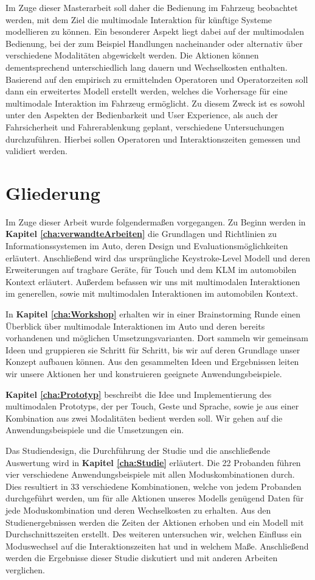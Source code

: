 Im Zuge dieser Masterarbeit soll daher die Bedienung im Fahrzeug beobachtet werden, mit dem Ziel die multimodale Interaktion für künftige Systeme modellieren zu können.
Ein besonderer Aspekt liegt dabei auf der multimodalen Bedienung, bei der zum Beispiel Handlungen nacheinander oder alternativ über verschiedene Modalitäten abgewickelt werden.
Die Aktionen können dementsprechend unterschiedlich lang dauern und Wechselkosten enthalten.
Basierend auf den empirisch zu ermittelnden Operatoren und Operatorzeiten soll dann ein erweitertes Modell erstellt werden, welches die Vorhersage für eine multimodale Interaktion im Fahrzeug ermöglicht.
Zu diesem Zweck ist es sowohl unter den Aspekten der Bedienbarkeit und User Experience, als auch der Fahrsicherheit und Fahrerablenkung geplant, verschiedene Untersuchungen durchzuführen.
Hierbei sollen Operatoren und Interaktionszeiten gemessen und validiert werden. 

\section*{Gliederung}
Im Zuge dieser Arbeit wurde folgendermaßen vorgegangen.
Zu Beginn werden in \textbf{Kapitel \ref{cha:verwandteArbeiten}} die Grundlagen und Richtlinien zu Informationssystemen im Auto, deren Design und Evaluationsmöglichkeiten erläutert.
Anschließend wird das ursprüngliche Keystroke-Level Modell und deren Erweiterungen auf tragbare Geräte, für Touch und dem KLM im automobilen Kontext erläutert.
Außerdem befassen wir uns mit multimodalen Interaktionen im generellen, sowie mit multimodalen Interaktionen im automobilen Kontext. 

In \textbf{Kapitel \ref{cha:Workshop}} erhalten wir in einer Brainstorming Runde einen Überblick über multimodale Interaktionen im Auto und deren bereits vorhandenen und möglichen Umsetzungsvarianten.
Dort sammeln wir gemeinsam Ideen und gruppieren sie Schritt für Schritt, bis wir auf deren Grundlage unser Konzept aufbauen können.
Aus den gesammelten Ideen und Ergebnissen leiten wir unsere Aktionen her und konstruieren geeignete Anwendungsbeispiele. 

\textbf{Kapitel \ref{cha:Prototyp}} beschreibt die Idee und Implementierung des multimodalen Prototyps, der per Touch, Geste und Sprache, sowie je aus einer Kombination aus zwei Modalitäten bedient werden soll. 
Wir gehen auf die Anwendungsbeispiele und die Umsetzungen ein. 

Das Studiendesign, die Durchführung der Studie und die anschließende Auswertung wird in \textbf{Kapitel \ref{cha:Studie}} erläutert.
Die 22 Probanden führen vier verschiedene Anwendungsbeispiele mit allen Moduskombinationen durch.
Dies resultiert in 33 verschiedene Kombinationen, welche von jedem Probanden durchgeführt werden, um für alle Aktionen unseres Modells genügend Daten für jede Moduskombination und deren Wechselkosten zu erhalten.
Aus den Studienergebnissen werden die Zeiten der Aktionen erhoben und ein Modell mit Durchschnittszeiten erstellt.
Des weiteren untersuchen wir, welchen Einfluss ein Moduswechsel auf die Interaktionszeiten hat und in welchem Maße.
Anschließend werden die Ergebnisse dieser Studie diskutiert und mit anderen Arbeiten verglichen.

